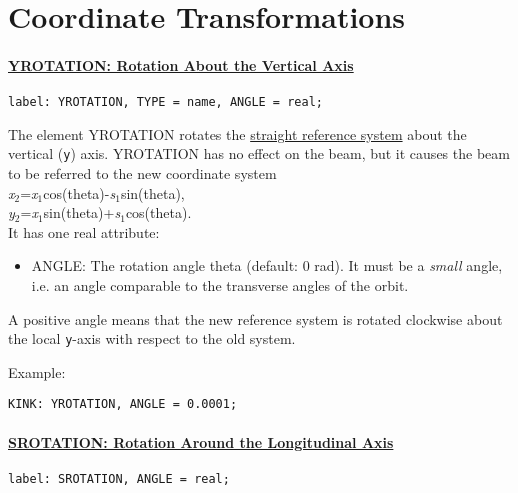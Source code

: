 
\section{Coordinate Transformations}

\paragraph{\href{yrotation}{YROTATION: Rotation About the Vertical Axis}}

\begin{verbatim}
label: YROTATION, TYPE = name, ANGLE = real;
\end{verbatim} 

The element YROTATION rotates the
\href{local_system.html#straight}{straight reference system} about the
vertical (\texttt{y}) axis. YROTATION has no effect on the beam, but it
causes the beam to be referred to the new coordinate system  \\
\textit{x}$_2$=\textit{x}$_1$cos(theta)-\textit{s}$_1$sin(theta), \\
\textit{y}$_2$=\textit{x}$_1$sin(theta)+\textit{s}$_1$cos(theta).\\

It has one real attribute: 
\begin{itemize}
   \item ANGLE: The rotation angle theta (default: 0 rad). It must be a
     \emph{small} angle, i.e. an angle comparable to the transverse
     angles of the orbit. 
\end{itemize} 

A positive angle means that the new reference system is rotated
clockwise about the local \texttt{y}-axis with respect to the old system. 

Example: 
\begin{verbatim}
KINK: YROTATION, ANGLE = 0.0001;
\end{verbatim}

\paragraph{\href{srotation}{SROTATION: Rotation Around the Longitudinal Axis}}

\begin{verbatim}
label: SROTATION, ANGLE = real;
\end{verbatim} 

